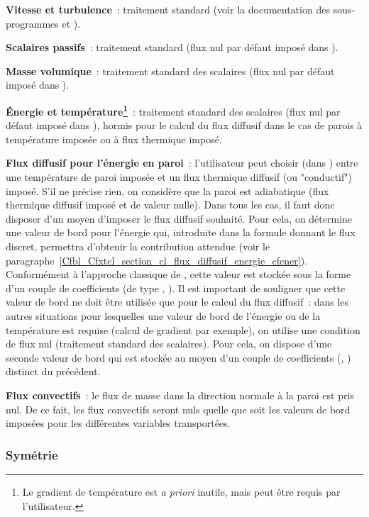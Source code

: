 {\bf Vitesse et turbulence}~: traitement standard (voir la documentation des
sous-programmes 
et ).

{\bf Scalaires passifs}~: traitement standard
(flux nul par d\'efaut impos\'e dans ).

{\bf Masse volumique}~: traitement standard des scalaires
(flux nul par d\'efaut impos\'e dans ).

{\bf \'Energie et temp\'erature\footnote{Le gradient de temp\'erature est
{\it a priori} inutile, mais peut \^etre requis par l'utilisateur.}}~:
traitement standard des scalaires
(flux nul par d\'efaut impos\'e dans ), hormis pour le
calcul du flux diffusif dans le cas de parois \`a temp\'erature impos\'ee
ou \`a flux thermique impos\'e.

{\bf Flux diffusif pour l'\'energie en paroi}~:
l'utilisateur peut choisir (dans ) entre une temp\'erature de paroi impos\'ee
et un flux thermique diffusif (ou "conductif") impos\'e.
S'il ne pr\'ecise rien, on consid\`ere que la paroi est adiabatique
(flux thermique diffusif impos\'e et de valeur nulle).
Dans tous les cas, il faut donc disposer d'un moyen d'imposer le flux diffusif
souhait\'e. Pour cela, on d\'etermine une valeur de bord pour l'\'energie
qui, introduite dans la formule donnant le flux discret, permettra
d'obtenir la contribution attendue
(voir le paragraphe~\ref{Cfbl_Cfxtcl_section_cl_flux_diffusif_energie_cfener}).
Conform\'ement \`a l'approche classique de \CS, cette valeur est
stock\'ee sous la forme d'un couple de coefficients
(de type , ).
Il est important de souligner que cette valeur de bord
ne doit \^etre utilis\'ee que pour le calcul
du flux diffusif~: dans les autres situations pour lesquelles
une valeur de bord de l'\'energie ou de la temp\'erature est requise
(calcul de gradient par exemple), on utilise une condition de flux nul
(traitement standard des scalaires). Pour cela, on dispose d'une
seconde valeur de bord qui est stock\'ee au moyen d'un
couple de coefficients (, ) distinct du pr\'ec\'edent.

{\bf Flux convectifs}~: le flux de masse dans la direction normale \`a la paroi est
pris nul. De ce fait, les flux convectifs seront nuls quelle que soit les valeurs
de bord impos\'ees pour les diff\'erentes variables transport\'ees.

\subsubsection*{Sym\'etrie}

